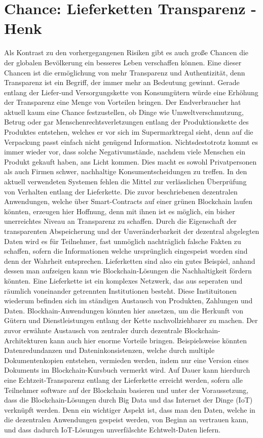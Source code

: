 \section{Chance: Lieferketten Transparenz - Henk}

Als Kontrast zu den vorhergegangenen Risiken gibt es auch große Chancen die der globalen Bevölkerung ein besseres Leben verschaffen können. Eine dieser Chancen ist die ermöglichung von mehr Transparenz und Authentizität, denn
Transparenz ist ein Begriff, der immer mehr an Bedeutung gewinnt. Gerade entlang der Liefer-und Versorgungskette von Konsumgütern würde eine Erhöhung der Transparenz eine Menge von Vorteilen bringen. Der Endverbraucher hat aktuell kaum eine Chance festzustellen, ob Dinge wie Umweltverschmutzung, Betrug oder gar Menschenrechtsverletzungen entlang der Produktionskette des Produktes entstehen, welches er vor sich im Supermarktregal sieht, denn auf die Verpackung passt einfach nicht genügend Information. Nichtsdestotrotz kommt es immer wieder vor, dass solche Negativumstände, nachdem viele Menschen ein Produkt gekauft haben, ans Licht kommen. Dies macht es sowohl Privatpersonen als auch Firmen schwer, nachhaltige Konsumentscheidungen zu treffen. In den aktuell verwendeten Systemen fehlen die Mittel zur verlässlichen Überprüfung von Verhalten entlang der Lieferkette\cite{lieferketteVerbraucherZentrale}. Die zuvor beschriebenen dezentralen Anwendungen, welche über Smart-Contracts auf einer grünen Blockchain laufen könnten, erzeugen hier Hoffnung, denn mit ihnen ist es möglich, ein bisher unerreichtes Niveau an Transparenz zu schaffen. Durch die Eigenschaft der transparenten Abspeicherung und der Unveränderbarkeit der dezentral abgelegten Daten wird es für Teilnehmer, fast unmöglich nachträglich falsche Fakten zu schaffen, sofern die Informationen welche ursprünglich eingespeist worden sind denn der Wahrheit entsprechen. Lieferketten sind also ein gutes Beispiel, anhand dessen man aufzeigen kann wie Blockchain-Lösungen die Nachhaltigkeit fördern könnten.\cite{supplyChainPaper} Eine Lieferkette ist ein komplexes Netzwerk, das aus seperaten und räumlich voneinander getrennten Institutionen besteht. Diese Instituitonen wiederum befinden sich im ständigen Austausch von Produkten, Zahlungen und Daten. Blockhain-Anwendungen könnten hier ansetzen, um die Herkunft von Gütern und Dienstleistungen entlang der Kette nachvollziehbarer zu machen. Der zuvor erwähnte Austausch von zentraler durch dezentrale Blockchain-Architekturen kann auch hier enorme Vorteile bringen. Beispielsweise könnten Datenredundanzen und Dateninkonsistenzen, welche durch multiple Dokumentenkopien entstehen, vermieden werden, indem nur eine Version eines Dokuments im Blockchain-Kursbuch vermerkt wird. Auf Dauer kann hierdurch eine Echtzeit-Transparenz entlang der Lieferkette erreicht werden, sofern alle Teilnehmer software auf der Blockchain basieren und unter der Voraussetzung, dass die Blockchain-Lösungen durch Big Data und das Internet der Dinge (IoT) verknüpft werden. Denn ein wichtiger Aspekt ist, dass man den Daten, welche in die dezentralen Anwendungen gespeist werden, von Beginn an vertrauen kann, und dass dadurch IoT-Lösungen unverfälschte Echtwelt-Daten liefern.\newline
